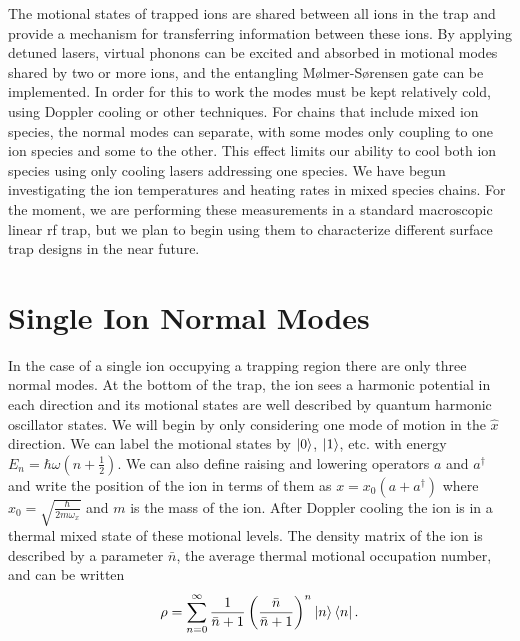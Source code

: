 
\graphicspath{ {\curdir/Graphics/}  }

The motional states of trapped ions are shared between all ions in the trap and provide a mechanism for transferring information between these ions.  By applying detuned lasers, virtual phonons can be excited and absorbed in motional modes shared by two or more ions, and the entangling M\o{}lmer-S\o{}rensen gate can be implemented.  In order for this to work the modes must be kept relatively cold, using Doppler cooling or other techniques.  For chains that include mixed ion species, the normal modes can separate, with some modes only coupling to one ion species and some to the other.  This effect limits our ability to cool both ion species using only cooling lasers addressing one species.  We have begun investigating the ion temperatures and heating rates in mixed species chains.  For the moment, we are performing these measurements in a standard macroscopic linear rf trap, but we plan to begin using them to characterize different surface trap designs in the near future.

\section{Single Ion Normal Modes}
\label{sec:single-modes}

In the case of a single ion occupying a trapping region there are only three normal modes.  At the bottom of the trap, the ion sees a harmonic potential in each direction and its motional states are well described by quantum harmonic oscillator states.  We will begin by only considering one mode of motion in the $\hat{x}$ direction.  We can label the motional states by $\left| 0 \right>$, $\left| 1 \right>$, etc. with energy $E_n = \hbar \omega (n + \frac{1}{2})$.  We can also define raising and lowering operators $a$ and $a^\dagger$ and write the position of the ion in terms of them as $x = x_0 (a + a^\dagger)$ where $x_0 = \sqrt{\frac{\hbar}{2 m \omega_x}}$ and $m$ is the mass of the ion.  After Doppler cooling the ion is in a thermal mixed state of these motional levels.  The density matrix of the ion is described by a parameter $\bar{n}$, the average thermal motional occupation number, and can be written
\begin{equation}
	\rho = \sum\limits_{n=0}^{\infty} \frac{1}{\bar{n}+1} \left( \frac{\bar{n}}{\bar{n} + 1} \right) ^ n \left| n \right> \left< n \right| \mathrm{.}
\end{equation}

